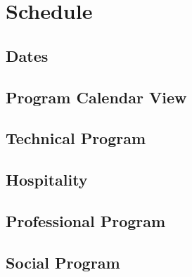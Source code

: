 \section{Schedule}


\subsection{Dates}


\subsection{Program Calendar View}

\subsection{Technical Program}


\subsection{Hospitality} 


\subsection{Professional Program}


\subsection{Social Program}


